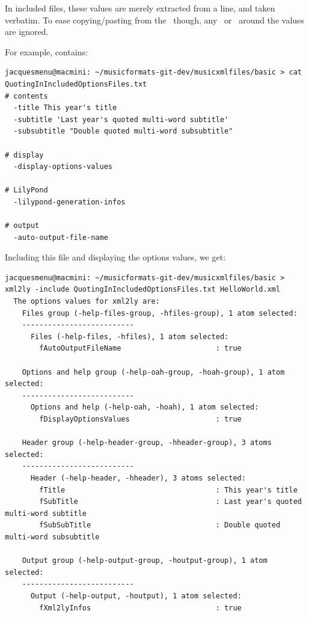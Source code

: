 In included files, these values are merely extracted from a line, and taken verbatim. To ease copying/pasting from the \CLI\, though, any \quotes\ or \doubleQuotes\ around the values are ignored.

For example,  contains:
\begin{lstlisting}[language=Terminal]
jacquesmenu@macmini: ~/musicformats-git-dev/musicxmlfiles/basic > cat QuotingInIncludedOptionsFiles.txt
# contents
  -title This year's title
  -subtitle 'Last year's quoted multi-word subtitle'
  -subsubtitle "Double quoted multi-word subsubtitle"

# display
  -display-options-values

# LilyPond
  -lilypond-generation-infos

# output
  -auto-output-file-name
\end{lstlisting}

Including this file and displaying the options values, we get:
\begin{lstlisting}[language=Terminal]
jacquesmenu@macmini: ~/musicformats-git-dev/musicxmlfiles/basic > xml2ly -include QuotingInIncludedOptionsFiles.txt HelloWorld.xml
  The options values for xml2ly are:
    Files group (-help-files-group, -hfiles-group), 1 atom selected:
    --------------------------
      Files (-help-files, -hfiles), 1 atom selected:
        fAutoOutputFileName                      : true

    Options and help group (-help-oah-group, -hoah-group), 1 atom selected:
    --------------------------
      Options and help (-help-oah, -hoah), 1 atom selected:
        fDisplayOptionsValues                    : true

    Header group (-help-header-group, -hheader-group), 3 atoms selected:
    --------------------------
      Header (-help-header, -hheader), 3 atoms selected:
        fTitle                                   : This year's title
        fSubTitle                                : Last year's quoted multi-word subtitle
        fSubSubTitle                             : Double quoted multi-word subsubtitle

    Output group (-help-output-group, -houtput-group), 1 atom selected:
    --------------------------
      Output (-help-output, -houtput), 1 atom selected:
        fXml2lyInfos                             : true
\end{lstlisting}


